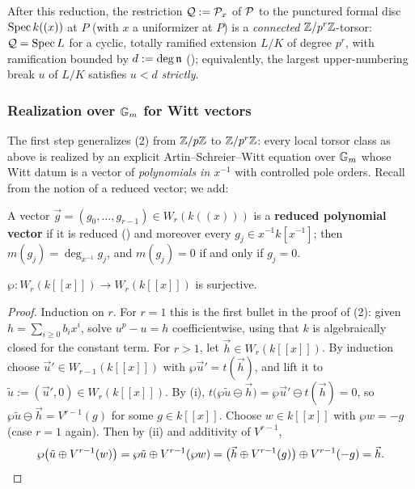 After this reduction, the restriction $\mathcal{Q} := \mathcal{P}_x$ of $\mathcal{P}$ to the punctured formal
disc $\operatorname{Spec} k((x))$ at $P$ (with $x$ a uniformizer at $P$) is a \emph{connected}
$\mathbb{Z}/p^r\mathbb{Z}$-torsor: $\mathcal{Q} = \operatorname{Spec} L$ for a cyclic, totally ramified extension $L/K$ of
degree $p^r$, with ramification bounded by $d := \deg \mathfrak{n}$
(); equivalently, the largest
upper-numbering break $u$ of $L/K$ satisfies $u < d$ \emph{strictly}.

\subsubsection*{Realization over $\mathbb{G}_m$ for Witt vectors}

The first step generalizes (2) from $\mathbb{Z}/p\mathbb{Z}$ to
$\mathbb{Z}/p^r\mathbb{Z}$: every local torsor class as above is realized by an explicit
Artin--Schreier--Witt equation over $\mathbb{G}_m$ whose Witt datum is a vector of
\emph{polynomials in $x^{-1}$} with controlled pole orders. Recall from
 the notion of a reduced vector; we add:

\begin{definition}\label{definition:reduced_polynomial_vector:reorg}
    A vector $\vec g = (g_0, \dots, g_{r-1}) \in W_r(k((x)))$ is a \textbf{reduced
    polynomial vector} if it is reduced () and
    moreover every $g_j \in x^{-1}k[x^{-1}]$; then $m(g_j) = \deg_{x^{-1}} g_j$, and
    $m(g_j) = 0$ if and only if $g_j = 0$.
\end{definition}

\begin{lemma}\label{lemma:wp_surjective_on_integral_witt:reorg}
    $\wp \colon W_r(k[[x]]) \to W_r(k[[x]])$ is surjective.
\end{lemma}

\begin{proof}
    Induction on $r$. For $r=1$ this is the first bullet in the proof of
    (2): given $h = \sum_{i \geq 0} b_i x^i$, solve
    $u^p - u = h$ coefficientwise, using that $k$ is algebraically closed for the
    constant term. For $r>1$, let $\vec h \in W_r(k[[x]])$. By induction choose
    $\vec u' \in W_{r-1}(k[[x]])$ with $\wp \vec u' = t(\vec h)$, and lift it to
    $\tilde u := (\vec u', 0) \in W_r(k[[x]])$. By
    (i),
    $t\bigl(\wp \tilde u \ominus \vec h\bigr) = \wp \vec u' \ominus t(\vec h) = 0$, so
    $\wp \tilde u \ominus \vec h = V^{r-1}(g)$ for some $g \in k[[x]]$. Choose
    $w \in k[[x]]$ with $\wp w = -g$ (case $r=1$ again). Then by
    (ii) and additivity of $V^{r-1}$,
    \[
    \wp\bigl(\tilde u \oplus V^{r-1}(w)\bigr)
    = \wp \tilde u \oplus V^{r-1}(\wp w)
    = \bigl(\vec h \oplus V^{r-1}(g)\bigr) \oplus V^{r-1}(-g) = \vec h. \qedhere
    \]
\end{proof}

